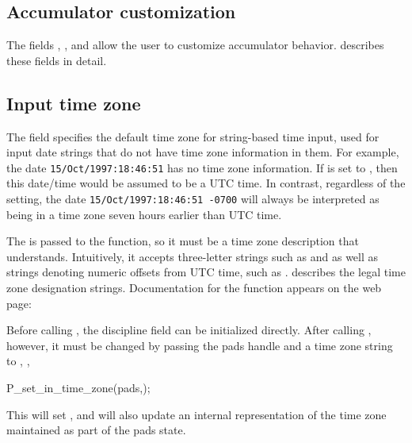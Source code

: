 \subsection{Accumulator customization}
\label{sec:library-customization-accumulator}
The fields , , and
 allow the user to customize accumulator behavior.  
 describes these fields in
detail.

\subsection{Input time zone}
\label{sec:library-customization-input-time-zone}
The field  specifies the default time zone for
string-based time input, used for input date strings 
that do not have time zone information in them.     For example, the date
\texttt{15/Oct/1997:18:46:51} has no time zone information.  If
 is set  to , 
then this date/time would be assumed to be a UTC time.
In contrast, regardless of the  setting, the date
\texttt{15/Oct/1997:18:46:51 -0700}
will always be interpreted as being in a time zone seven hours
earlier than UTC time.

The  is passed to the  function, so it
must be a time zone description that 
understands. Intuitively, it accepts three-letter strings such as 
  and   as well as strings
denoting numeric offsets from UTC time, such as .
 describes the legal time zone designation strings.
Documentation for the  function appears on the web page:


Before calling , the discipline field 
can be initialized directly.  After calling , however, it
must be changed by passing the pads handle and a time zone string to 
, \eg{},

\begin{centercode}
    P\_set\_in\_time\_zone(pads,);
\end{centercode}

This will set , and will also update
an internal representation of the time zone maintained as part of
the pads state.

